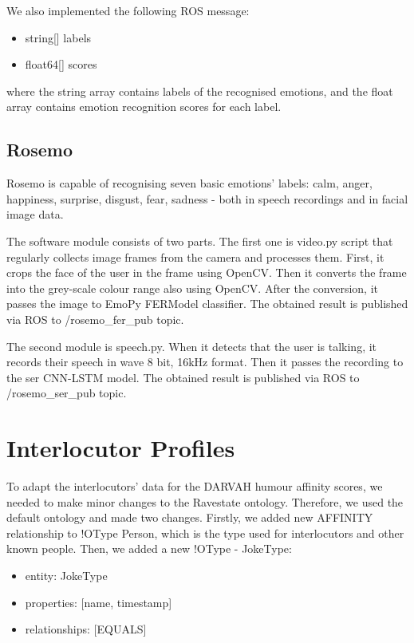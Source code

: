 We also implemented the following ROS message:
\begin{itemize}
    \item string[] labels
    \item float64[] scores
\end{itemize}
where the string array contains labels of the recognised emotions, and the float array contains emotion recognition scores for each label.

\subsection{Rosemo}

Rosemo is capable of recognising seven basic emotions' labels: calm, anger, happiness, surprise, disgust, fear, sadness - both in speech recordings and in facial image data.

The software module consists of two parts. The first one is video.py script that regularly collects image frames from the camera and processes them. First, it crops the face of the user in the frame using OpenCV. Then it converts the frame into the grey-scale colour range also using OpenCV. After the conversion, it passes the image to EmoPy FERModel classifier. The obtained result is published via ROS to /rosemo\_fer\_pub topic.

The second module is speech.py. When it detects that the user is talking, it records their speech in wave 8 bit, 16kHz format. Then it passes the recording to the \acrshort{ser} CNN-LSTM model. The obtained result is published via ROS to /rosemo\_ser\_pub topic.

\section{Interlocutor Profiles}

To adapt the interlocutors' data for the DARVAH humour affinity scores, we needed to make minor changes to the Ravestate ontology. Therefore, we used the default ontology and made two changes. Firstly, we added new AFFINITY relationship to !OType Person, which is the type used for interlocutors and other known people. Then, we added a new !OType - JokeType:
\begin{itemize}
    \item entity: JokeType
    \item properties: [name, timestamp]
    \item relationships: [EQUALS]
\end{itemize}

